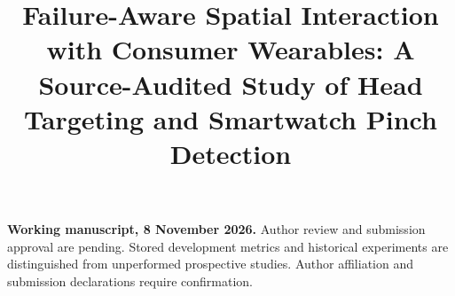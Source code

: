 \documentclass[pdflatex,sn-mathphys-num]{sn-jnl}
\begin{document}
\title[Failure-Aware Spatial Interaction]{Failure-Aware Spatial Interaction with Consumer Wearables: A Source-Audited Study of Head Targeting and Smartwatch Pinch Detection}
\author{ }
\abstract{}
\maketitle
\noindent\textbf{Working manuscript, 8 November 2026.} Author review and submission approval are pending. Stored development metrics and historical experiments are distinguished from unperformed prospective studies. Author affiliation and submission declarations require confirmation.


\end{document}
